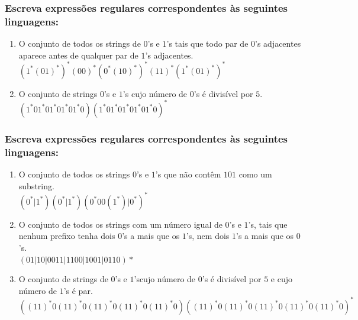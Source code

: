 \documentclass[a4paper,12pt]{article}
\begin{document}
        \subsubsection{Escreva expressões regulares corresponden\-tes às seguintes linguagens:}
            \begin{enumerate}[label={\bfseries \alph*)}]
                \item O conjunto de todos os strings de $0$'s e $1$'s tais que todo par de $0$'s adjacentes aparece antes de qualquer par de $1$'s adjacentes.
                    \\ $(1^*(01)^*)^*(00)^*(0^*(10)^*)^*(11)^*(1^*(01)^*)^*$
                \item O conjunto de strings $0$'s e $1$'s cujo número de $0$'s é divisível por $5$.
                    \\ $(1^*01^*01^*01^*01^*0)(1^*01^*01^*01^*01^*0)^*$
            \end{enumerate}
        
        \subsubsection{Escreva expressões regulares corresponden\-tes às seguintes linguagens:}
            \begin{enumerate}[start=1, label={\bfseries \alph*)}]
                \item O conjunto de todos os strings $0$'s e $1$'s que não contêm $101$ como um substring.
                    \\ $(0^*|1^*)(0^*|1^*)(0^*00(1^*)|0^*)^*$
                \item O conjunto de todos os strings com um número igual de $0$'s e $1$'s, tais que nenhum prefixo tenha dois $0$'s a mais que os $1$'s, nem dois $1$'s a mais que os $0$'s.
                    \\ $(01|10|0011|1100|1001|0110)*$
                \item O conjunto de strings de $0$'s e $1$'scujo número de $0$'s é divisível por $5$ e cujo número de $1$'s é par.
                    \\ $((11)^*0(11)^*0(11)^*0(11)^*0(11)^*0)((11)^*0(11)^*0(11)^*0(11)^*0(11)^*0)^*$
            \end{enumerate}
        
\end{document}
